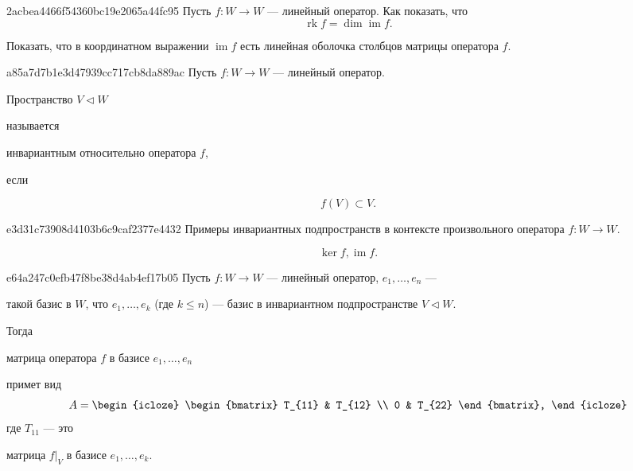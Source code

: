 \begin{note}{2acbea4466f54360bc19e2065a44fc95}
    Пусть \( f : W \to W \) --- линейный оператор. Как показать, что
    \[
        \operatorname{rk} f = \dim \operatorname{im} f.
    \]

    \begin{cloze}{1}
        Показать, что в координатном выражении \( \operatorname{im} f \) есть линейная оболочка столбцов матрицы оператора \( f \).
    \end{cloze}
\end{note}

\begin{note}{a85a7d7b1e3d47939cc717cb8da889ac}
    Пусть \( f : W \to W \) --- линейный оператор. \begin{icloze}{1}Пространство \( V \triangleleft W \)\end{icloze} называется \begin{icloze}{2}инвариантным относительно оператора \( f \),\end{icloze} если
    \begin{icloze}{1}\[
        f(V) \subset V.
    \]\end{icloze}
\end{note}

\begin{note}{e3d31c73908d4103b6c9caf2377e4432}
    Примеры инвариантных подпространств в контексте произвольного оператора \( f : W \to W \).

    \begin{cloze}{1}
        \[
            \ker f, \operatorname{im} f.
        \]
    \end{cloze}
\end{note}

\begin{note}{e64a247c0efb47f8be38d4ab4ef17b05}
    Пусть \( f : W \to W \) --- линейный оператор,  \( e_1, \ldots, e_n  \) --- \begin{icloze}{4}такой базис в \({ W }\), что \({ e_1, \ldots, e_k }\) (где \({ k \leqslant n }\)) --- базис в инвариантном подпространстве \({ V \triangleleft W }\).\end{icloze} Тогда \begin{icloze}{3}матрица оператора \( f \) в базисе \( e_1, \ldots, e_n  \)\end{icloze} примет вид
    \[
        A = \begin{icloze}{1}
            \begin{bmatrix}
                T_{11} & T_{12} \\
                0 & T_{22}
            \end{bmatrix},
        \end{icloze}
    \]
    где \( T_{11}  \) --- это \begin{icloze}{2}матрица \( f |_{V}  \) в базисе \( e_1, \ldots, e_k \).\end{icloze}
\end{note}

